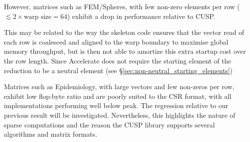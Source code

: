 However, matrices such as FEM/Spheres, with few non-zero elements per row
($\lesssim 2 \times \text{warp size} = 64$) exhibit a drop in performance
relative to CUSP.


This may be related to the way the skeleton code ensures that
the vector read of each row is coalesced and aligned to the warp boundary to
maximise global memory throughput, but is then not able to amortize this extra
startup cost over the row length. Since Accelerate does not require the starting
element of the reduction to be a neutral element (see
\S\ref{sec:non-neutral_starting_elements})


Matrices such as Epidemiology, with large vectors and few non-zeros
per row, exhibit low flop:byte ratio and are poorly suited to the CSR format,
with all implementations performing well below peak. The regression relative to
our previous result will be investigated. Nevertheless, this highlights the
nature of sparse computations and the reason the CUSP library supports several
algorithms and matrix formats.


